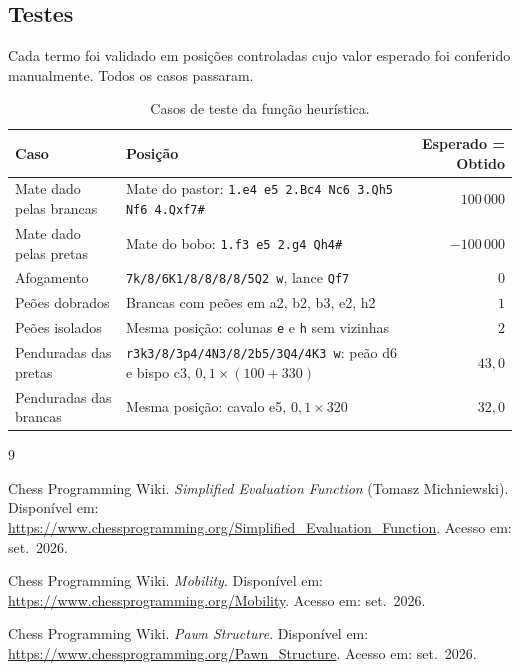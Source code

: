 \documentclass[12pt,a4paper]{article}
\begin{document}
\subsection{Testes}

Cada termo foi validado em posições controladas cujo valor esperado foi
conferido manualmente. Todos os casos passaram.

\begin{table}[h]
  \centering
  \caption{Casos de teste da função heurística.}
  \small
  \begin{tabular}{>{\raggedright\arraybackslash}p{3.4cm} >{\raggedright\arraybackslash}p{6.8cm} r}
    \toprule
    Caso & Posição & Esperado = Obtido \\
    \midrule
    Mate dado pelas brancas
      & Mate do pastor: \texttt{1.e4 e5 2.Bc4 Nc6 3.Qh5 Nf6 4.Qxf7\#}
      & $100\,000$ \\
    Mate dado pelas pretas
      & Mate do bobo: \texttt{1.f3 e5 2.g4 Qh4\#}
      & $-100\,000$ \\
    Afogamento
      & \texttt{7k/8/6K1/8/8/8/8/5Q2 w}, lance \texttt{Qf7}
      & $0$ \\
    Peões dobrados
      & Brancas com peões em a2, b2, b3, e2, h2
      & $1$ \\
    Peões isolados
      & Mesma posição: colunas \texttt{e} e \texttt{h} sem vizinhas
      & $2$ \\
    Penduradas das pretas
      & \texttt{r3k3/8/3p4/4N3/8/2b5/3Q4/4K3 w}: peão d6 e bispo c3, $0{,}1\times(100+330)$
      & $43{,}0$ \\
    Penduradas das brancas
      & Mesma posição: cavalo e5, $0{,}1\times 320$
      & $32{,}0$ \\
    \bottomrule
  \end{tabular}
\end{table}

\begin{thebibliography}{9}
\raggedright

Chess Programming Wiki. \emph{Simplified Evaluation Function}
(Tomasz Michniewski).
Disponível em: \url{https://www.chessprogramming.org/Simplified_Evaluation_Function}.
Acesso em: set.\ 2026.

Chess Programming Wiki. \emph{Mobility}.
Disponível em: \url{https://www.chessprogramming.org/Mobility}.
Acesso em: set.\ 2026.

Chess Programming Wiki. \emph{Pawn Structure}.
Disponível em: \url{https://www.chessprogramming.org/Pawn_Structure}.
Acesso em: set.\ 2026.

\end{thebibliography}
\end{document}
